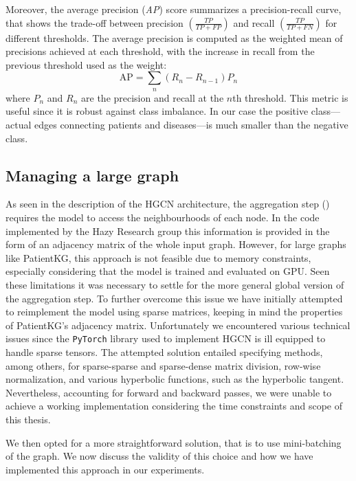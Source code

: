 Moreover, the average precision (\emph{AP}) score summarizes a precision-recall curve, that shows the trade-off between precision $\left(\frac{TP}{TP+FP}\right)$ and recall $\left(\frac{TP}{TP+FN}\right)$ for different thresholds. The average precision is computed as the weighted mean of precisions achieved at each threshold, with the increase in recall from the previous threshold used as the weight:
\begin{equation*}
  \text{AP} = \sum_n (R_n - R_{n-1}) P_n
\end{equation*} 
where $P_n$ and $R_n$ are the precision and recall at the $n$th threshold.
This metric is useful since it is robust against class imbalance. In our case the positive class—actual edges connecting patients and diseases—is much smaller than the negative class.

\subsection{Managing a large graph}
As seen in the description of the HGCN architecture, the aggregation step () requires the model to access the neighbourhoods of each node. In the code implemented by the Hazy Research group this information is provided in the form of an adjacency matrix of the whole input graph. However, for large graphs like PatientKG, this approach is not feasible due to memory constraints, especially considering that the model is trained and evaluated on GPU.
Seen these limitations it was necessary to settle for the more general global version of the aggregation step. 
To further overcome this issue we have initially attempted to reimplement the model using sparse matrices, keeping in mind the properties of PatientKG's adjacency matrix. Unfortunately we encountered various technical issues since the \texttt{PyTorch} library used to implement HGCN is ill equipped to handle sparse tensors. The attempted solution entailed specifying methods, among others, for sparse-sparse and sparse-dense matrix division, row-wise normalization, and various hyperbolic functions, such as the hyperbolic tangent. Nevertheless, accounting for forward and backward passes, we were unable to achieve a working implementation considering the time constraints and scope of this thesis.

We then opted for a more straightforward solution, that is to use mini-batching of the graph. We now discuss the validity of this choice and how we have implemented this approach in our experiments.

